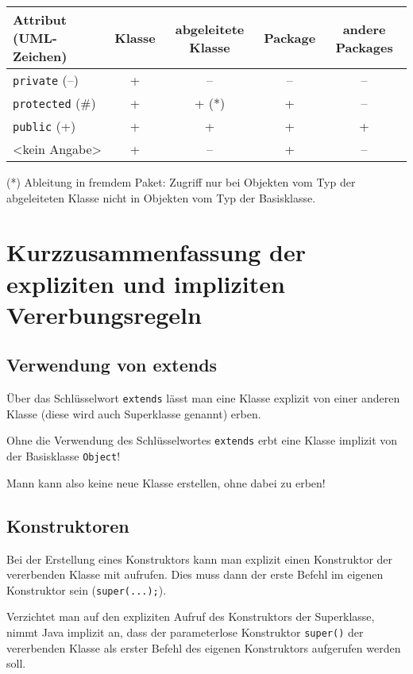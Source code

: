 \begin{center}
\bgroup
\def\arraystretch{1.2}
\begin{tabular}{|l|c|c|c|c|}
\hline
\textbf{Attribut (UML-Zeichen)} & \textbf{Klasse} & \textbf{abgeleitete
Klasse} & \textbf{Package} & \textbf{andere Packages} \\ \hline
\verb|private| (--)   &  +  & --    & -- & -- \\ \hline
\verb|protected| (\#) &  +  & + (*) &  + & -- \\ \hline
\verb|public| (+)     &  +  &  +    &  + & +  \\ \hline
<kein Angabe>         &  +  & --    &  + & -- \\ \hline
\end{tabular}
\egroup
\end{center}

(*) Ableitung in fremdem Paket: Zugriff nur bei Objekten vom Typ der
abgeleiteten Klasse nicht in Objekten vom Typ der Basisklasse.


\section{Kurzzusammenfassung der expliziten und impliziten Vererbungsregeln}

\subsection{Verwendung von extends}

Über das Schlüsselwort \verb|extends| lässt man eine Klasse explizit von einer 
anderen Klasse (diese wird auch Superklasse genannt) erben.

Ohne die Verwendung des Schlüsselwortes \verb|extends| erbt eine Klasse implizit 
von der Basisklasse \verb|Object|!

Mann kann also keine neue Klasse erstellen, ohne dabei zu erben!


\subsection{Konstruktoren}

Bei der Erstellung eines Konstruktors kann man explizit einen Konstruktor der 
vererbenden Klasse mit aufrufen. Dies muss dann der erste Befehl im eigenen 
Konstruktor sein (\verb|super(...);|).

Verzichtet man auf den expliziten Aufruf des Konstruktors der Superklasse, nimmt 
Java implizit an, dass der parameterlose Konstruktor \verb|super()| der 
vererbenden Klasse als erster Befehl des eigenen Konstruktors aufgerufen werden 
soll.

